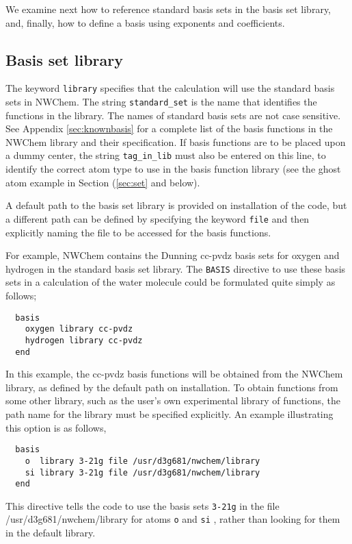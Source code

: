 We examine next how to reference standard basis sets in the basis set
library, and, finally, how to define a basis using exponents and
coefficients.

\subsection{Basis set library}

The keyword \verb+library+ specifies that the calculation will use the
standard basis sets in NWChem.  The string \verb+standard_set+ is the
name that identifies the functions in the library.  The names of
standard basis sets are not case sensitive.  See Appendix
\ref{sec:knownbasis} for a complete list of the basis functions in the
NWChem library and their specification.  If basis functions are to be
placed upon a dummy center, the string \verb+tag_in_lib+ must also be
entered on this line, to identify the correct atom type to use in the
basis function library (see the ghost atom example in Section
(\ref{sec:set} and below).

A default path to the basis set library is provided on installation of
the code, but a different path can be defined by specifying the
keyword \verb+file+ and then explicitly naming the file to be accessed
for the basis functions.

For example, NWChem contains the Dunning cc-pvdz basis sets for
oxygen and hydrogen in the standard basis set library.  The \verb+BASIS+
directive to use these basis sets in a calculation of the water molecule
could be formulated quite simply as follows;

\begin{verbatim}
  basis
    oxygen library cc-pvdz
    hydrogen library cc-pvdz
  end
\end{verbatim}

In this example, the cc-pvdz basis functions will be obtained from the
NWChem library, as defined by the default path on installation.  To obtain
functions from some other library, such as the user's own experimental
library of functions, the path name for the library must be specified
explicitly.  An example illustrating this option is as follows,

\begin{verbatim}
  basis
    o  library 3-21g file /usr/d3g681/nwchem/library
    si library 3-21g file /usr/d3g681/nwchem/library
  end
\end{verbatim}

This directive tells the code to use the basis sets \verb+3-21g+ in
the file /usr/d3g681/nwchem/library for atoms \verb+o+ and \verb+si+ ,
rather than looking for them in the default library.

